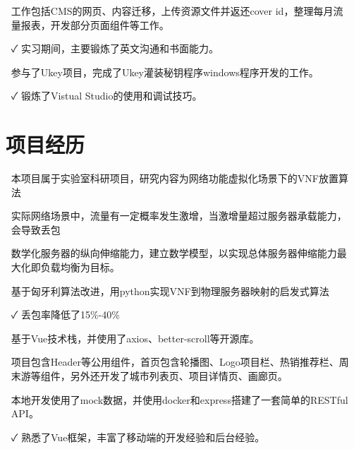 \documentclass[14pt]{resume}
\begin{document}
\begin{itemize}
    \item[\faFlagO] 工作包括CMS的网页、内容迁移，上传资源文件并返还cover id，整理每月流量报表，开发部分页面组件等工作。
    \item[\faCheck] 实习期间，主要锻炼了英文沟通和书面能力。
\end{itemize}

\begin{itemize}
    \item[\faFlagO] 参与了Ukey项目，完成了Ukey灌装秘钥程序windows程序开发的工作。
    \item[\faCheck] 锻炼了Vistual Studio的使用和调试技巧。
\end{itemize}

\section{\faUsers\ 项目经历}

\begin{onehalfspacing}
\begin{itemize}
    \item[\faFlagO] 本项目属于实验室科研项目，研究内容为网络功能虚拟化场景下的VNF放置算法
    \item[\faFlagO] 实际网络场景中，流量有一定概率发生激增，当激增量超过服务器承载能力，会导致丢包
    \item[\faCode] 数学化服务器的纵向伸缩能力，建立数学模型，以实现总体服务器伸缩能力最大化即负载均衡为目标。
    \item[\faCode] 基于匈牙利算法改进，用python实现VNF到物理服务器映射的启发式算法
    \item[\faCheck] 丢包率降低了15\%-40\%
\end{itemize}
\end{onehalfspacing}

\begin{onehalfspacing}
\begin{itemize}
    \item[\faFlagO] 基于Vue技术栈，并使用了axios、better-scroll等开源库。
    \item[\faFlagO] 项目包含Header等公用组件，首页包含轮播图、Logo项目栏、热销推荐栏、周末游等组件，另外还开发了城市列表页、项目详情页、画廊页。
    \item[\faCode] 本地开发使用了mock数据，并使用docker和express搭建了一套简单的RESTful API。
    \item[\faCheck] 熟悉了Vue框架，丰富了移动端的开发经验和后台经验。
\end{itemize}
\end{onehalfspacing}
\end{document}
